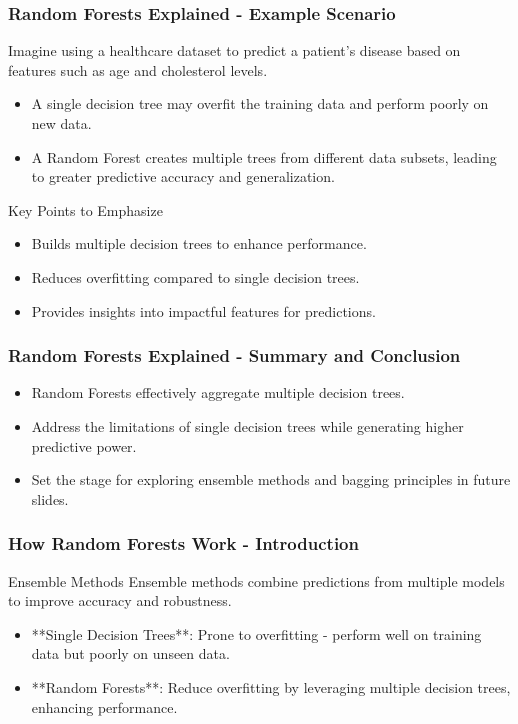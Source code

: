 \documentclass[aspectratio=169]{beamer}
\begin{document}
\begin{frame}[fragile]
    \frametitle{Random Forests Explained - Example Scenario}
    Imagine using a healthcare dataset to predict a patient's disease based on features such as age and cholesterol levels.
    \begin{itemize}
        \item A single decision tree may overfit the training data and perform poorly on new data.
        \item A Random Forest creates multiple trees from different data subsets, leading to greater predictive accuracy and generalization.
    \end{itemize}
    \begin{block}{Key Points to Emphasize}
        \begin{itemize}
            \item Builds multiple decision trees to enhance performance.
            \item Reduces overfitting compared to single decision trees.
            \item Provides insights into impactful features for predictions.
        \end{itemize}
    \end{block}
\end{frame}

\begin{frame}[fragile]
    \frametitle{Random Forests Explained - Summary and Conclusion}
    \begin{itemize}
        \item Random Forests effectively aggregate multiple decision trees.
        \item Address the limitations of single decision trees while generating higher predictive power.
        \item Set the stage for exploring ensemble methods and bagging principles in future slides.
    \end{itemize}
\end{frame}

\begin{frame}[fragile]
    \frametitle{How Random Forests Work - Introduction}
    \begin{block}{Ensemble Methods}
        Ensemble methods combine predictions from multiple models to improve accuracy and robustness.
    \end{block}
    \begin{itemize}
        \item **Single Decision Trees**: Prone to overfitting - perform well on training data but poorly on unseen data.
        \item **Random Forests**: Reduce overfitting by leveraging multiple decision trees, enhancing performance.
    \end{itemize}
\end{frame}
\end{document}
